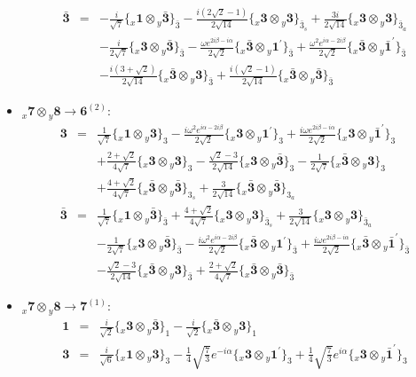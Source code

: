 \documentclass[english]{article}
\newcommand{\rep}[1]{\mathbf{#1}}
\newcommand{\repx}[2]{{}_{#2}\mathbf{#1}}
\newcommand{\subcg}[3]{\big\{ \repx{#1}{x}\otimes\repx{#2}{y}\big\}^{}_{#3}}
\begin{document}
\begin{itemize}
\begin{eqnarray*}
\\
\rep{\bar{3}} &=& -\frac{i}{\sqrt{7}}\subcg{1}{\bar{3}}{\bar{3}}-\frac{i \left(2 \sqrt{2}-1\right)}{2 \sqrt{14}}\subcg{3}{3}{\bar{3}_{s}}+\frac{3 i}{2 \sqrt{14}}\subcg{3}{3}{\bar{3}_{a}} \\ 
 & & -\frac{i}{2 \sqrt{7}}\subcg{3}{\bar{3}}{\bar{3}}-\frac{\omega  e^{2 i \beta -i \alpha }}{2 \sqrt{2}}\subcg{\bar{3}}{1^{\prime}}{\bar{3}}+\frac{\omega ^2 e^{i \alpha -2 i \beta }}{2 \sqrt{2}}\subcg{\bar{3}}{\bar{1}^{\prime}}{\bar{3}} \\ 
 & & -\frac{i \left(3+\sqrt{2}\right)}{2 \sqrt{14}}\subcg{\bar{3}}{3}{\bar{3}}+\frac{i \left(\sqrt{2}-1\right)}{2 \sqrt{14}}\subcg{\bar{3}}{\bar{3}}{\bar{3}}
\end{eqnarray*}
\item $\repx{7}{x}\otimes\repx{8}{y}\to\rep{6}^{(2)}$:
\begin{eqnarray*}
\rep{3} &=& \frac{1}{\sqrt{7}}\subcg{1}{3}{3}-\frac{i \omega ^2 e^{i \alpha -2 i \beta }}{2 \sqrt{2}}\subcg{3}{1^{\prime}}{3}+\frac{i \omega  e^{2 i \beta -i \alpha }}{2 \sqrt{2}}\subcg{3}{\bar{1}^{\prime}}{3} \\ 
 & & +\frac{2+\sqrt{2}}{4 \sqrt{7}}\subcg{3}{3}{3}-\frac{\sqrt{2}-3}{2 \sqrt{14}}\subcg{3}{\bar{3}}{3}-\frac{1}{2 \sqrt{7}}\subcg{\bar{3}}{3}{3} \\ 
 & & +\frac{4+\sqrt{2}}{4 \sqrt{7}}\subcg{\bar{3}}{\bar{3}}{3_{s}}+\frac{3}{2 \sqrt{14}}\subcg{\bar{3}}{\bar{3}}{3_{a}}
\\
\rep{\bar{3}} &=& \frac{1}{\sqrt{7}}\subcg{1}{\bar{3}}{\bar{3}}+\frac{4+\sqrt{2}}{4 \sqrt{7}}\subcg{3}{3}{\bar{3}_{s}}+\frac{3}{2 \sqrt{14}}\subcg{3}{3}{\bar{3}_{a}} \\ 
 & & -\frac{1}{2 \sqrt{7}}\subcg{3}{\bar{3}}{\bar{3}}-\frac{i \omega ^2 e^{i \alpha -2 i \beta }}{2 \sqrt{2}}\subcg{\bar{3}}{1^{\prime}}{\bar{3}}+\frac{i \omega  e^{2 i \beta -i \alpha }}{2 \sqrt{2}}\subcg{\bar{3}}{\bar{1}^{\prime}}{\bar{3}} \\ 
 & & -\frac{\sqrt{2}-3}{2 \sqrt{14}}\subcg{\bar{3}}{3}{\bar{3}}+\frac{2+\sqrt{2}}{4 \sqrt{7}}\subcg{\bar{3}}{\bar{3}}{\bar{3}}
\end{eqnarray*}
\item $\repx{7}{x}\otimes\repx{8}{y}\to\rep{7}^{(1)}$:
\begin{eqnarray*}
\rep{1} &=& \frac{i}{\sqrt{2}}\subcg{3}{\bar{3}}{1}-\frac{i}{\sqrt{2}}\subcg{\bar{3}}{3}{1}
\\
\rep{3} &=& \frac{i}{\sqrt{6}}\subcg{1}{3}{3}-\frac{1}{4} \sqrt{\frac{7}{3}} e^{-i \alpha }\subcg{3}{1^{\prime}}{3}+\frac{1}{4} \sqrt{\frac{7}{3}} e^{i \alpha }\subcg{3}{\bar{1}^{\prime}}{3} \\ 

\end{eqnarray*}
\end{itemize}
\end{document}
